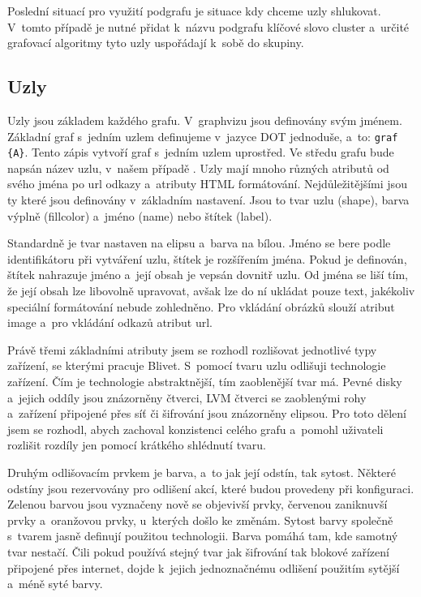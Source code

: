 \documentclass[color,table,oneside,nolot,nolof]{fithesis}
\begin{document}
	Poslední situací pro využití podgrafu je situace kdy chceme uzly shlukovat. V~tomto případě je nutné přidat k~názvu podgrafu klíčové slovo cluster a~určité grafovací algoritmy tyto uzly 
	uspořádají k~sobě do skupiny.

\subsection{Uzly}
	Uzly jsou základem každého grafu. V~graphvizu jsou definovány svým jménem. Základní graf s~jedním uzlem definujeme v~jazyce DOT jednoduše, a~to: \texttt{graf \{A\}}. Tento zápis vytvoří
	graf s~jedním uzlem uprostřed. Ve středu grafu bude napsán název uzlu, v~našem případě . Uzly mají mnoho různých atributů od svého jména po url odkazy a~atributy HTML formátování. 
	Nejdůležitějšími jsou ty které jsou definovány v~základním nastavení. Jsou to tvar uzlu (shape), barva výplně (fillcolor) a~jméno (name) nebo štítek (label). 
	
	Standardně je tvar nastaven na elipsu a~barva
	na bílou. Jméno se bere podle identifikátoru při vytváření uzlu, štítek je rozšířením jména. Pokud je definován, štítek nahrazuje jméno a~její obsah je vepsán dovnitř uzlu. Od jména se liší 
	tím, že její obsah lze libovolně upravovat, avšak lze do ní ukládat pouze text, jakékoliv speciální formátování nebude zohledněno. Pro vkládání obrázků slouží atribut image a~pro vkládání
	odkazů atribut url.

	Právě třemi základními atributy jsem se rozhodl rozlišovat jednotlivé typy zařízení, se kterými pracuje Blivet. S~pomocí tvaru uzlu odlišuji technologie zařízení. Čím je technologie
	abstraktnější, tím zaoblenější tvar má. Pevné disky a~jejich oddíly jsou znázorněny čtverci, LVM čtverci se zaoblenými rohy a~zařízení připojené přes síť či šifrování jsou znázorněny elipsou.
	Pro toto dělení jsem se rozhodl, abych zachoval konzistenci celého grafu a~pomohl uživateli rozlišit rozdíly jen pomocí krátkého shlédnutí tvaru.

	Druhým odlišovacím prvkem je barva, a~to jak její odstín, tak sytost. Některé odstíny jsou rezervovány pro odlišení akcí, které budou provedeny při konfiguraci. Zelenou barvou jsou vyznačeny
	nově se objevivší prvky, červenou zaniknuvší prvky a~oranžovou prvky, u~kterých došlo ke změnám. Sytost barvy společně s~tvarem jasně definují použitou technologii. Barva pomáhá tam, kde
	samotný tvar nestačí. Čili pokud používá stejný tvar jak šifrování tak blokové zařízení připojené přes internet, dojde k~jejich jednoznačnému odlišení použitím sytější a~méně syté barvy.
\end{document}
